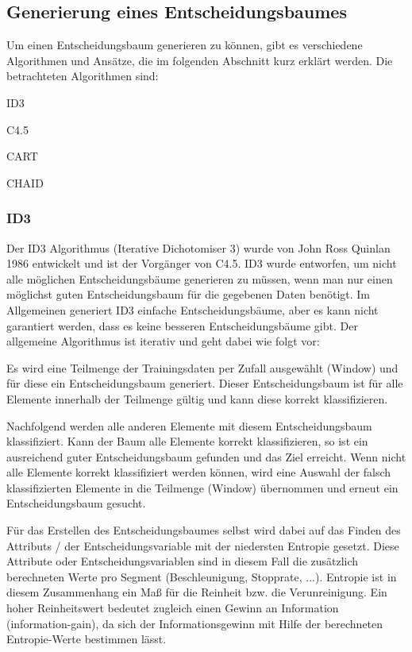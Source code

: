\subsection{Generierung eines Entscheidungsbaumes}
\label{entscheidungsbaumAlgorithmen}
Um einen Entscheidungsbaum generieren zu können, gibt es verschiedene Algorithmen und Ansätze, die im folgenden Abschnitt kurz erklärt werden. Die betrachteten Algorithmen sind:
\begin{pitemize}
\item ID3
\item C4.5
\item CART
\item CHAID
\end{pitemize}

\subsubsection{ID3}
Der ID3 Algorithmus (Iterative Dichotomiser 3) wurde von John Ross Quinlan 1986 entwickelt und ist der Vorgänger von C4.5. ID3 wurde entworfen, um nicht alle möglichen Entscheidungsbäume generieren zu müssen, wenn man nur einen möglichst guten Entscheidungsbaum für die gegebenen Daten benötigt. Im Allgemeinen generiert ID3 einfache Entscheidungsbäume, aber es kann nicht garantiert werden, dass es keine besseren Entscheidungsbäume gibt. Der allgemeine Algorithmus ist iterativ und geht dabei wie folgt vor: \cite{john_ross_quinlan_1986}

\begin{pitemize}
\item Es wird eine Teilmenge der Trainingsdaten per Zufall ausgewählt (Window) und für diese ein Entscheidungsbaum generiert. Dieser Entscheidungsbaum ist für alle Elemente innerhalb der Teilmenge gültig und kann diese korrekt klassifizieren. 
\item Nachfolgend werden alle anderen Elemente mit diesem Entscheidungsbaum klassifiziert. Kann der Baum alle Elemente korrekt klassifizieren, so ist ein ausreichend guter Entscheidungsbaum gefunden und das Ziel erreicht. Wenn nicht alle Elemente korrekt klassifiziert werden können, wird eine Auswahl der falsch klassifizierten Elemente in die Teilmenge (Window) übernommen und erneut ein Entscheidungsbaum gesucht. 
\end{pitemize}

Für das Erstellen des Entscheidungsbaumes selbst wird dabei auf das Finden des Attributs / der Entscheidungsvariable mit der niedersten Entropie gesetzt. Diese Attribute oder Entscheidungsvariablen sind in diesem Fall die zusätzlich berechneten Werte pro Segment (Beschleunigung, Stopprate, ...). Entropie ist in diesem Zusammenhang ein Maß für die Reinheit bzw. die Verunreinigung. \cite{howard_hamilton_machine_2009} Ein hoher Reinheitswert bedeutet zugleich einen Gewinn an Information (information-gain), da sich der Informationsgewinn mit Hilfe der berechneten Entropie-Werte bestimmen lässt. \cite{thomas_mitchell_which_1997}

